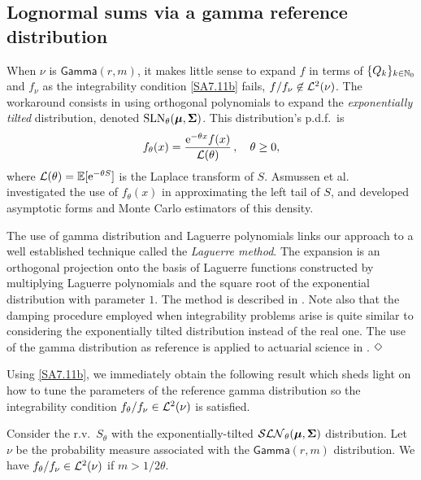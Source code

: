 \subsection{Lognormal sums via a gamma reference distribution} \label{SS:LNGammaNu}

When $\nu$ is $\mathsf{Gamma}(r,m)$, it makes little sense to expand $f$ in terms of $\{Q_{k}\}_{k\in\mathbb{N}_0}$ and $f_\nu$ as the integrability condition \eqref{SA7.11b} fails, $f/f_\nu \not\in\mathcal{L}^{2}(\nu)$. The workaround consists in using orthogonal polynomials to expand the \emph{exponentially tilted} distribution, denoted $\mathrm{SLN}_\theta(\bm{\mu}, \bm{\Sigma})$. This distribution's p.d.f.\ is
\begin{equation}\label{ExponentiallyTiltedPDF}
f_\theta(x) = \frac{\mathrm{e}^{-\theta x}f(x)}{\mathcal{L}(\theta)} \,,\quad \theta \ge 0,
\end{equation}
where $\mathcal{L}(\theta)=\operatorname{{\mathbb E}}[\mathrm{e}^{-\theta S}]$ is the Laplace transform of $S$. Asmussen et al.\ \cite{asmussen2015exponential} investigated the use of $f_\theta(x)$ in approximating the left tail of $S$, and developed asymptotic forms and Monte Carlo estimators of this density.
\begin{remark}
The use of gamma distribution and Laguerre polynomials links our approach to a well established technique called the \emph{Laguerre method}. The expansion is an orthogonal projection onto the basis of Laguerre functions constructed by multiplying Laguerre polynomials and the square root of the exponential distribution with parameter $1$. The method is described in \cite{Abate1995}. Note also that the damping procedure employed when integrability problems arise is quite similar to considering the exponentially tilted distribution instead of the real one. The use of the gamma distribution as reference is applied to actuarial science in \cite{GoLoPo16,GoLoPo15}.
$\hfill \Diamond$
\end{remark}
Using \eqref{SA7.11b}, we immediately obtain the following result which
sheds light on how to tune the parameters of the reference gamma distribution so the integrability condition $f_\theta / f_\nu \in\mathcal{L}^2(\nu)$ is satisfied.
\begin{proposition}\label{pr:IntegrabiltyConditionWRTGammaDistribution}
Consider the r.v.\ $S_\theta$ with the exponentially-tilted $\mathcal{SLN}_\theta(\boldsymbol{\mu},\bm{\Sigma})$ distribution. Let $\nu$ be the probability measure associated with the $\mathsf{Gamma}(r,m)$ distribution. We have $f_\theta/f_\nu \in\mathcal{L}^2(\nu)$ if
$m>1/2\theta$.
\end{proposition}


